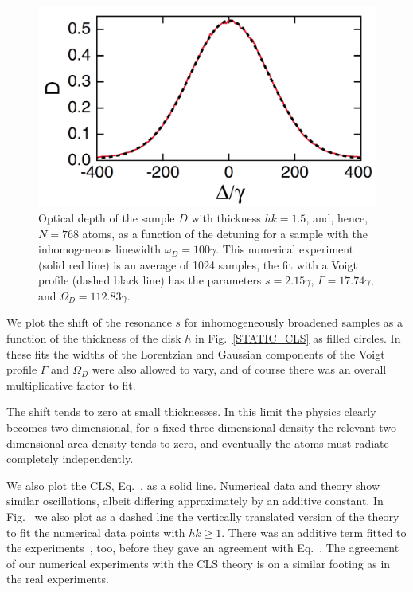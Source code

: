 \begin{figure}[h!]
\begin{center}
\includegraphics[width=\textwidth]{inhomo_D.pdf}
\end{center}
\caption{Optical depth of the sample $D$ with thickness $hk=1.5$, and, hence, $N=768$ atoms, as a function of the detuning for a sample with the inhomogeneous linewidth $\omega_D=100\gamma$. This numerical experiment (solid red line) is an average of 1024 samples, the fit with a Voigt profile (dashed black line) has the parameters $s=2.15\gamma$, $\Gamma=17.74\gamma$, and $\Omega_D=112.83\gamma$.}
\label{INHOMO_D}
\end{figure}

We plot the shift of the resonance $s$ for inhomogeneously broadened samples as a function of the thickness of the disk $h$ in Fig.~\ref{STATIC_CLS} as filled circles.  In these fits the widths of the Lorentzian and Gaussian components of the Voigt profile $\Gamma$ and $\Omega_D$ were also allowed to vary, and of course there was an overall multiplicative factor to fit.

The shift tends to zero at small thicknesses. In this limit the physics clearly becomes two dimensional, for a fixed three-dimensional density the relevant two-dimensional area density tends to zero, and eventually the atoms must radiate completely independently. 

We also plot the CLS, Eq.~, as a solid line. Numerical data and theory show similar oscillations, albeit differing approximately by an additive constant. In Fig.~ we also plot as a dashed line the vertically translated version of the theory to fit the numerical data points with $hk\geq 1$. There was an additive term fitted to the experiments~\cite{PhysRevLett.108.173601}, too, before they gave an agreement with Eq.~. The agreement of our numerical experiments with the CLS theory is on a similar footing as in the real experiments.


